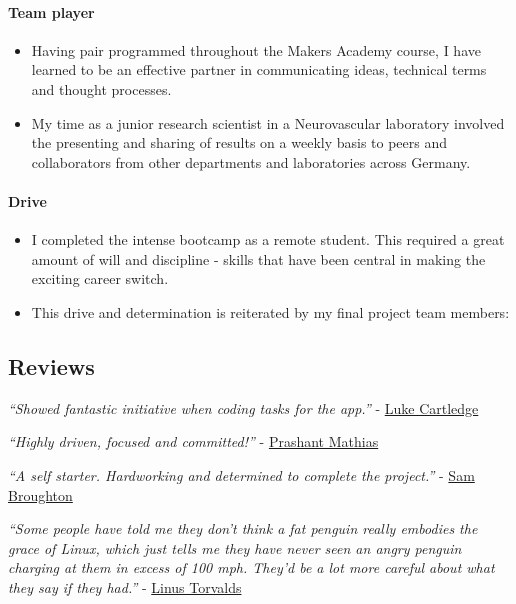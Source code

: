 \documentclass[]{article}
\providecommand{\tightlist}{%
  \setlength{\itemsep}{0pt}\setlength{\parskip}{0pt}}
\let\oldparagraph\paragraph
\renewcommand{\paragraph}[1]{\oldparagraph{#1}\mbox{}}
\begin{document}
\paragraph{Team player}\label{team-player}

\begin{itemize}
\tightlist
\item
  Having pair programmed throughout the Makers Academy course, I have
  learned to be an effective partner in communicating ideas, technical
  terms and thought processes.
\item
  My time as a junior research scientist in a Neurovascular laboratory
  involved the presenting and sharing of results on a weekly basis to
  peers and collaborators from other departments and laboratories across
  Germany.
\end{itemize}

\paragraph{Drive}\label{drive}

\begin{itemize}
\tightlist
\item
  I completed the intense bootcamp as a remote student. This required a
  great amount of will and discipline - skills that have been central in
  making the exciting career switch.
\item
  This drive and determination is reiterated by my final project team
  members:
\end{itemize}

\subsection{Reviews}\label{reviews}

\emph{``Showed fantastic initiative when coding tasks for the app.''} -
\href{https://github.com/lukecartledge}{Luke Cartledge}

\emph{``Highly driven, focused and committed!''} -
\href{https://github.com/prashantmathias}{Prashant Mathias}

\emph{``A self starter. Hardworking and determined to complete the
project.''} - \href{https://github.com/samjbro}{Sam Broughton}

\emph{``Some people have told me they don't think a fat penguin really
embodies the grace of Linux, which just tells me they have never seen an
angry penguin charging at them in excess of 100 mph. They'd be a lot
more careful about what they say if they had.''} -
\href{https://www.linkedin.com/in/linustorvalds}{Linus Torvalds}
\end{document}
